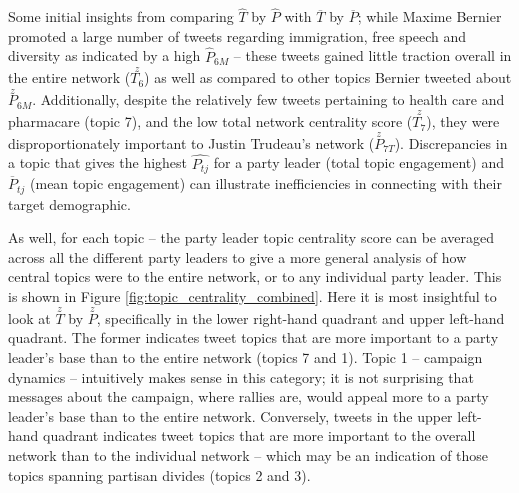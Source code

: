 Some initial insights from comparing \textbf{$\hat{T}$} by \textbf{$\hat{P}$}
with \textbf{$\overline{T}$} by \textbf{$\overline{P}$}; while Maxime Bernier
promoted a large number of tweets regarding immigration, free speech and
diversity as indicated by a high $\hat{P}_{6M}$ -- these tweets gained little
traction overall in the entire network ($\stackrel{z}{T_{6}}$) as well as
compared to other topics Bernier tweeted about $\stackrel{z}{P}_{6M}$.
Additionally, despite the relatively few tweets pertaining to health care and
pharmacare (topic 7), and the low total network centrality score
($\stackrel{z}{T_{7}}$), they were disproportionately important to Justin
Trudeau's network ($\stackrel{z}{P}_{7T}$). Discrepancies in a topic that gives
the highest $\hat{P_{tj}}$ for a party leader (total topic engagement) and
$\overline{P}_{tj}$  (mean topic engagement) can illustrate inefficiencies in
connecting with their target demographic.

As well, for each topic -- the party leader topic centrality score can be
averaged across all the different party leaders to give a more general analysis
of how central topics were to the entire network, or to any individual party
leader. This is shown in Figure \ref{fig:topic_centrality_combined}. Here it is
most insightful to look at \textbf{$\stackrel{z}{T}$} by
\textbf{$\stackrel{z}{P}$}, specifically in the lower right-hand quadrant and
upper left-hand quadrant. The former indicates tweet topics that are more
important to a party leader's base than to the entire network (topics 7 and 1).
Topic 1 -- campaign dynamics -- intuitively makes sense in this category; it is
not surprising that messages about the campaign, where rallies are, \etc would
appeal more to a party leader's base than to the entire network. Conversely,
tweets in the upper left-hand quadrant indicates tweet topics that are more
important to the overall network than to the individual network -- which may be
an indication of those topics spanning partisan divides (topics 2 and 3).

